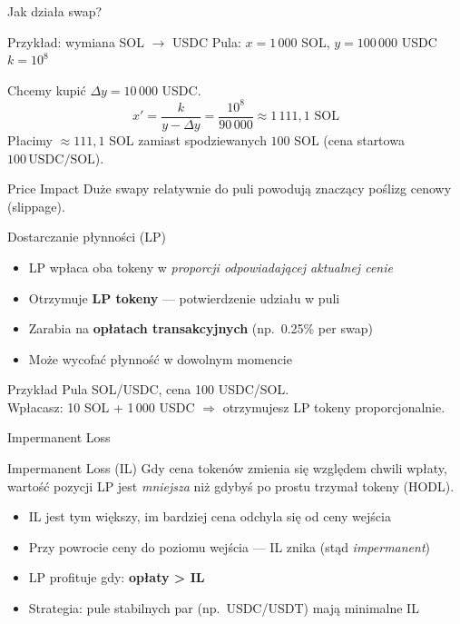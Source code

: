 \begin{frame}{Jak działa swap?}
  \begin{exampleblock}{Przykład: wymiana SOL $\to$ USDC}
    Pula: $x = 1\,000$ SOL, $y = 100\,000$ USDC \quad $k = 10^8$

    Chcemy kupić $\Delta y = 10\,000$ USDC.
    \[
      x' = \frac{k}{y - \Delta y} = \frac{10^8}{90\,000} \approx 1\,111{,}1 \text{ SOL}
    \]
    Płacimy $\approx 111{,}1$ SOL zamiast spodziewanych $100$ SOL (cena startowa $100\,\text{USDC/SOL}$).
  \end{exampleblock}
  \begin{alertblock}{Price Impact}
    Duże swapy relatywnie do puli powodują znaczący poślizg cenowy (slippage).
  \end{alertblock}
\end{frame}

\begin{frame}{Dostarczanie płynności (LP)}
  \begin{itemize}
    \item LP wpłaca oba tokeny w \emph{proporcji odpowiadającej aktualnej cenie}
    \item Otrzymuje \textbf{LP tokeny} --- potwierdzenie udziału w puli
    \item Zarabia na \textbf{opłatach transakcyjnych} (np.\ 0.25\% per swap)
    \item Może wycofać płynność w dowolnym momencie
  \end{itemize}
  \vspace{0.3cm}
  \begin{exampleblock}{Przykład}
    Pula SOL/USDC, cena 100 USDC/SOL. \\
    Wpłacasz: 10 SOL + 1\,000 USDC $\Rightarrow$ otrzymujesz LP tokeny proporcjonalnie.
  \end{exampleblock}
\end{frame}

\begin{frame}{Impermanent Loss}
  \begin{alertblock}{Impermanent Loss (IL)}
    Gdy cena tokenów zmienia się względem chwili wpłaty, wartość pozycji LP jest
    \emph{mniejsza} niż gdybyś po prostu trzymał tokeny (HODL).
  \end{alertblock}
  \vspace{0.3cm}
  \begin{itemize}
    \item IL jest tym większy, im bardziej cena odchyla się od ceny wejścia
    \item Przy powrocie ceny do poziomu wejścia --- IL znika (stąd \emph{impermanent})
    \item LP profituje gdy: \textbf{opłaty > IL}
    \item Strategia: pule stabilnych par (np.\ USDC/USDT) mają minimalne IL
  \end{itemize}
\end{frame}

